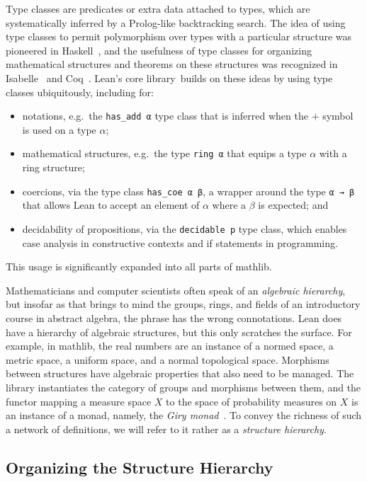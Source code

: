 \documentclass[sigplan]{acmart}\settopmatter{}
\newcommand{\mathlib}{\textsf{mathlib}\xspace}
\newcommand{\corelib}{\textsf{core} library\xspace}
\begin{document}
Type classes are predicates or extra data attached to types, which are systematically inferred by a Prolog-like backtracking search.
The idea of using type classes to permit polymorphism over types with a particular structure was pioneered in Haskell~\cite{Wadl89}, and the usefulness of type classes for organizing mathematical structures and theorems on these structures was recognized in Isabelle~\cite{Wenzel97, Haft06} and Coq~\cite{Spit11}.
Lean's \corelib\ builds on these ideas by using type classes ubiquitously, including for:
\begin{itemize}
\item notations, e.g.\ the \lstinline{has_add α} type class that is inferred when the $+$ symbol is used on a type $\alpha$;
\item mathematical structures, e.g.\ the type \lstinline{ring α} that equips a type $\alpha$ with a ring structure;
\item coercions, via the type class \lstinline{has_coe α β}, a wrapper around the type \lstinline{α → β} that allows Lean to accept an element of $\alpha$ where a $\beta$ is expected; and
\item decidability of propositions, via the \lstinline{decidable p} type class, which enables case analysis in constructive contexts and if statements in programming.
\end{itemize}
This usage is significantly expanded into all parts of \mathlib.

Mathematicians and computer scientists often speak of an \emph{algebraic hierarchy}, but insofar as that brings to mind the groups, rings, and fields of an introductory course in abstract algebra, the phrase has the wrong connotations.
Lean does have a hierarchy of algebraic structures,
but this only scratches the surface.
For example, in \mathlib, the real numbers are an instance of a normed space, a metric space, a uniform space, and a normal topological space.
Morphisms between structures have algebraic properties that also need to be managed.
The library instantiates the category of groups and morphisms between them, and the functor mapping a measure space $X$ to the space of probability measures on $X$ is an instance of a monad, namely, the \emph{Giry monad}~\cite{Giry82}.
To convey the richness of such a network of definitions, we will refer to it rather as a \emph{structure hierarchy}.

\subsection{Organizing the Structure Hierarchy}
\label{subsection:typeclasses:hierarchy}
\end{document}
